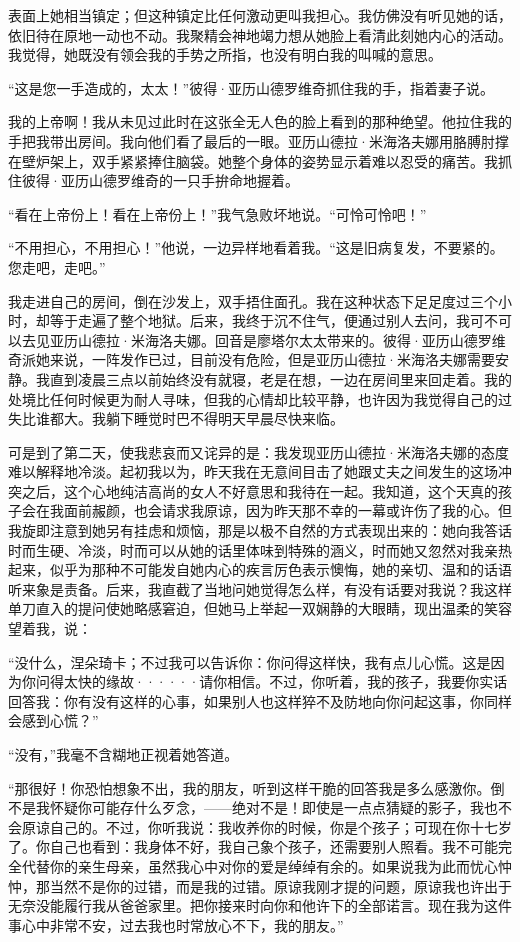 \documentclass[12pt, UTF8]{ctexbook}
\begin{document}
\par 表面上她相当镇定；但这种镇定比任何激动更叫我担心。我仿佛没有听见她的话，依旧待在原地一动也不动。我聚精会神地竭力想从她脸上看清此刻她内心的活动。我觉得，她既没有领会我的手势之所指，也没有明白我的叫喊的意思。
\par “这是您一手造成的，太太！”彼得·亚历山德罗维奇抓住我的手，指着妻子说。
\par 我的上帝啊！我从未见过此时在这张全无人色的脸上看到的那种绝望。他拉住我的手把我带出房间。我向他们看了最后的一眼。亚历山德拉·米海洛夫娜用胳膊肘撑在壁炉架上，双手紧紧捧住脑袋。她整个身体的姿势显示着难以忍受的痛苦。我抓住彼得·亚历山德罗维奇的一只手拚命地握着。
\par “看在上帝份上！看在上帝份上！”我气急败坏地说。“可怜可怜吧！”
\par “不用担心，不用担心！”他说，一边异样地看着我。“这是旧病复发，不要紧的。您走吧，走吧。”
\par 我走进自己的房间，倒在沙发上，双手捂住面孔。我在这种状态下足足度过三个小时，却等于走遍了整个地狱。后来，我终于沉不住气，便通过别人去问，我可不可以去见亚历山德拉·米海洛夫娜。回音是廖塔尔太太带来的。彼得·亚历山德罗维奇派她来说，一阵发作已过，目前没有危险，但是亚历山德拉·米海洛夫娜需要安静。我直到凌晨三点以前始终没有就寝，老是在想，一边在房间里来回走着。我的处境比任何时候更为耐人寻味，但我的心情却比较平静，也许因为我觉得自己的过失比谁都大。我躺下睡觉时巴不得明天早晨尽快来临。
\par 可是到了第二天，使我悲哀而又诧异的是：我发现亚历山德拉·米海洛夫娜的态度难以解释地冷淡。起初我以为，昨天我在无意间目击了她跟丈夫之间发生的这场冲突之后，这个心地纯洁高尚的女人不好意思和我待在一起。我知道，这个天真的孩子会在我面前赧颜，也会请求我原谅，因为昨天那不幸的一幕或许伤了我的心。但我旋即注意到她另有挂虑和烦恼，那是以极不自然的方式表现出来的：她向我答话时而生硬、冷淡，时而可以从她的话里体味到特殊的涵义，时而她又忽然对我亲热起来，似乎为那种不可能发自她内心的疾言厉色表示懊悔，她的亲切、温和的话语听来象是责备。后来，我直截了当地问她觉得怎么样，有没有话要对我说？我这样单刀直入的提问使她略感窘迫，但她马上举起一双娴静的大眼睛，现出温柔的笑容望着我，说：
\par “没什么，涅朵琦卡；不过我可以告诉你：你问得这样快，我有点儿心慌。这是因为你问得太快的缘故······请你相信。不过，你听着，我的孩子，我要你实话回答我：你有没有这样的心事，如果别人也这样猝不及防地向你问起这事，你同样会感到心慌？”
\par “没有，”我毫不含糊地正视着她答道。
\par “那很好！你恐怕想象不出，我的朋友，听到这样干脆的回答我是多么感激你。倒不是我怀疑你可能存什么歹念，——绝对不是！即使是一点点猜疑的影子，我也不会原谅自己的。不过，你听我说：我收养你的时候，你是个孩子；可现在你十七岁了。你自己也看到：我身体不好，我自己象个孩子，还需要别人照看。我不可能完全代替你的亲生母亲，虽然我心中对你的爱是绰绰有余的。如果说我为此而忧心忡忡，那当然不是你的过错，而是我的过错。原谅我刚才提的问题，原谅我也许出于无奈没能履行我从爸爸家里。把你接来时向你和他许下的全部诺言。现在我为这件事心中非常不安，过去我也时常放心不下，我的朋友。”
\end{document}
